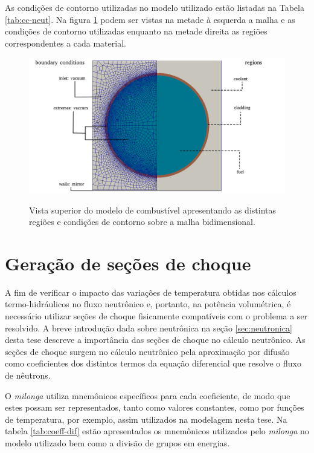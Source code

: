 As condições de contorno utilizadas no modelo utilizado estão listadas na Tabela
\ref{tab:cc-neut}. Na figura \ref{fig:cc-neut} podem ser vistas na metade à esquerda
a malha e as condições de contorno utilizadas enquanto na metade direita as
regiões correspondentes a cada material.


\begin{figure}[htb]
  \caption{Vista superior do modelo de combustível apresentando as distintas regiões e condições de contorno
    sobre a malha bidimensional.}
  \centering\includegraphics[scale=0.52]{figuras/regions_neutronica_malha_e_sem.png}
  \label{fig:cc-neut}
\end{figure}


\section{Geração de seções de choque}
\label{sec:gerxs}

A fim de verificar o impacto das variações de temperatura obtidas nos cálculos
termo-hidráulicos no fluxo
neutrônico e, portanto, na potência volumétrica, é necessário utilizar seções de choque
fisicamente compatíveis com o problema a ser resolvido. A breve introdução dada sobre
neutrônica na seção \ref{sec:neutronica} desta tese descreve a importância das seções
de choque no cálculo neutrônico. As seções de choque surgem no cálculo neutrônico
pela aproximação por difusão como coeficientes dos distintos termos da equação
diferencial que resolve o fluxo de nêutrons.

O \textit{milonga} utiliza mnemônicos específicos para cada coeficiente, de modo
que estes possam ser representados, tanto como valores constantes, como por funções
de temperatura, por exemplo, assim utilizados na modelagem nesta tese. Na tabela
\ref{tab:coeff-dif} estão apresentados os mnemônicos utilizados pelo \textit{milonga}
no modelo utilizado bem como a divisão de grupos em energias.

